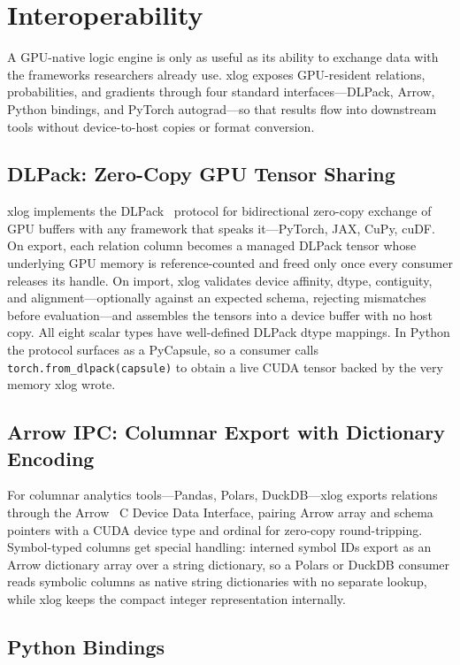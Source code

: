 \section{Interoperability}\label{sec:interop}

A GPU-native logic engine is only as useful as its ability to exchange data with the frameworks researchers already use. xlog exposes GPU-resident relations, probabilities, and gradients through four standard interfaces---DLPack, Arrow, Python bindings, and PyTorch autograd---so that results flow into downstream tools without device-to-host copies or format conversion.

\subsection{DLPack: Zero-Copy GPU Tensor Sharing}

xlog implements the DLPack~\cite{dlpack} protocol for bidirectional zero-copy exchange of GPU buffers with any framework that speaks it---PyTorch, JAX, CuPy, cuDF. On export, each relation column becomes a managed DLPack tensor whose underlying GPU memory is reference-counted and freed only once every consumer releases its handle. On import, xlog validates device affinity, dtype, contiguity, and alignment---optionally against an expected schema, rejecting mismatches before evaluation---and assembles the tensors into a device buffer with no host copy. All eight scalar types have well-defined DLPack dtype mappings. In Python the protocol surfaces as a PyCapsule, so a consumer calls \texttt{torch.from\_dlpack(capsule)} to obtain a live CUDA tensor backed by the very memory xlog wrote.

\subsection{Arrow IPC: Columnar Export with Dictionary Encoding}

For columnar analytics tools---Pandas, Polars, DuckDB---xlog exports relations through the Arrow~\cite{arrow} C Device Data Interface, pairing Arrow array and schema pointers with a CUDA device type and ordinal for zero-copy round-tripping. Symbol-typed columns get special handling: interned symbol IDs export as an Arrow dictionary array over a string dictionary, so a Polars or DuckDB consumer reads symbolic columns as native string dictionaries with no separate lookup, while xlog keeps the compact integer representation internally.

\subsection{Python Bindings}

